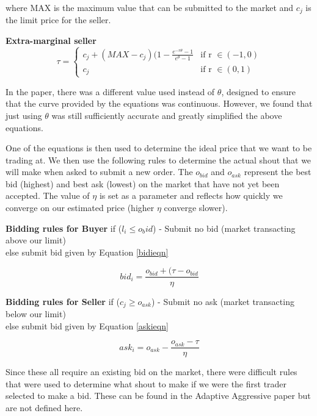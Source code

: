 \documentclass{acm_proc_article-sp}
\begin{document}
where MAX is the maximum value that can be submitted to the market and $c_j$ is
the limit price for the seller.

\textbf{Extra-marginal seller}
\begin{equation}
\tau =
\begin{cases}
      c_j + (MAX-c_j)(1-\frac{e^{-r\theta}-1}{e^\theta-1} &  \text{if r } \in (-1,0)  \\
      c_j & \text{if r } \in (0,1)
\end{cases}
\label{extraseller}
\end{equation}

In the paper, there was a different value used instead of $\theta$, designed to
ensure that the curve provided by the equations was continuous. However, we
found that just using $\theta$ was still sufficiently accurate and greatly
simplified the above equations.

One of the equations is then used to determine the ideal price that we want to
be trading at. We then use the following rules to determine the actual shout
that we will make when asked to submit a new order. The $o_{bid}$ and $o_{ask}$
represent the best bid (highest) and best ask (lowest) on the market that have
not yet been accepted. The value of $\eta$ is set as a parameter and reflects
how quickly we converge on our estimated price (higher $\eta$ converge slower).

\textbf{Bidding rules for Buyer}
if ($l_i \leq o_bid$) - Submit no bid (market transacting above our limit)\\
else submit bid given by Equation \ref{bidieqn}

\begin{equation}
bid_i = \frac{o_{bid} + (\tau - o_{bid}}{\eta}
\label{bidieqn}
\end{equation}

\textbf{Bidding rules for Seller}
if ($c_j \geq o_{ask}$) - Submit no ask (market transacting below our limit)\\
else submit bid given by Equation \ref{askieqn}

\begin{equation}
ask_i = o_{ask} - \frac{o_{ask}-\tau}{\eta}
\label{askieqn}
\end{equation}

Since these all require an existing bid on the market, there were difficult
rules that were used to determine what shout to make if we were the first
trader selected to make a bid. These can be found in the Adaptive Aggressive
paper \cite[p.~32]{AA_paper} but are not defined here.
\end{document}
